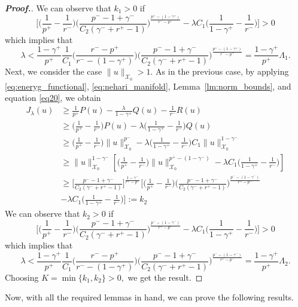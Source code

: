\documentclass[11pt]{article}
\newcommand{\X}{\mathcal{X}_{0}}
\newcommand{\ga} {\gamma}
\newcommand{\la} {\lambda}
\newcommand{\La} {\Lambda}
\newcommand{\lsb}{\left[}
\newcommand{\rsb}{\right]}
\begin{document}
\begin{proof}[\bf Proof.]
    We can observe that $k_1>0$
if 
    $$
    \Big [ \Big (
\frac{1}{p^+}-
\frac{1}{r^-} \Big ) 
\Big  (
\frac{p^- - 1 + \gamma^-}{C_2(\gamma^- + r^+ - 1)}
\Big  )^
\frac{p^+-(1-\ga^+)}{{r^- - p^+}}-\la C_1 \Big (
\frac{1}{1-\ga^+}-
\frac{1}{r^-} \Big )\Big ]>0$$
    which implies that 
     $$
     \la<
\frac{1-\ga^+}{p^+}
\frac{1}{C_1}\Big (
\frac{r^--p^+}{r^--(1-\ga^+)}\Big ) 
\Big (
\frac{p^- - 1 + \gamma^-}{C_2(\gamma^- + r^+ - 1)}
\Big )^
\frac{p^+-(1-\ga^+)}{{r^- - p^+}}=
\frac{1-\ga^+}{p^+}\La_1.$$
     Next, we consider the case 
$\|u\|_{\X}>1.$
As in the previous case, by applying 
\eqref{eq:eneryg_functional}, 
\eqref{eq:nehari_manifold}, 
Lemma~\ref{lm:norm_bounds}, and equation 
\eqref{eq20}, we obtain
     \begin{align*}
        J_\la(u) & \ge 
\frac{1}{p^+}P(u)-
\frac{\la}{1-\ga^+}Q(u)-
\frac{1}{r^-}R(u)\\
         & \ge  \Big (
\frac{1}{p^+}-
\frac{1}{r^-} \Big ) P(u)-\la \Big (
\frac{1}{1-\ga^+}-
\frac{1}{r^-} \Big ) Q(u)\\
         & \ge  \Big (
\frac{1}{p^+}-
\frac{1}{r^-} \Big ) \|u\|_{\X}^{p^-}-\la \Big (
\frac{1}{1-\ga^+}-
\frac{1}{r^-} \Big ) C_1\|u\|_{\X}^{1-\ga^-}\\
         & \ge \|u\|_{\X}^{1-\ga^-}\lsb\Big (
\frac{1}{p^+}-
\frac{1}{r^-} \Big ) \|u\|_{\X}^{p^+-(1-\ga^-)}-\la C_1 \Big (
\frac{1}{1-\ga^+}-
\frac{1}{r^-} \Big )\rsb\\
         & \ge  \Big [
\frac{p^- - 1 + \gamma^-}{C_2(\gamma^- + r^+ - 1)}\Big ]^
\frac{1-\ga^-}{{r^+ - p^-}}\Big [\Big (
\frac{1}{p^+}-
\frac{1}{r^-} \Big ) 
\Big  (
\frac{p^- - 1 + \gamma^-}{C_2(\gamma^- + r^+ - 1)}
\Big  )^
\frac{p^--(1-\ga^-)}{{r^+ - p^-}} \\
        &  -\la C_1 \Big (
\frac{1}{1-\ga^+}-
\frac{1}{r^-} \Big )\Big ]:=k_2
    \end{align*}
    We can observe that $k_2>0$
if 
    $$\Big [ \Big (
\frac{1}{p^+}-
\frac{1}{r^-} \Big ) 
\Big  (
\frac{p^- - 1 + \gamma^-}{C_2(\gamma^- + r^+ - 1)}
\Big  )^
\frac{p^--(1-\ga^-)}{{r^+ - p^-}}-\la C_1 \Big (
\frac{1}{1-\ga^+}-
\frac{1}{r^-} \Big )\Big ]>0$$
    which implies that 
     $$\la<
\frac{1-\ga^+}{p^+}
\frac{1}{C_1}\Big (
\frac{r^--p^+}{r^--(1-\ga^+)}\Big ) 
\Big  (
\frac{p^- - 1 + \gamma^-}{C_2(\gamma^- + r^+ - 1)}
\Big  )^
\frac{p^--(1-\ga^-)}{{r^+ - p^-}}=
\frac{1-\ga^+}{p^+}\La_2.$$
     Choosing $K=\min\{k_1,k_2\}>0,$
we get the result.
\end{proof}
Now, with all the required lemmas in hand, 
we can prove the following results.
\end{document}
